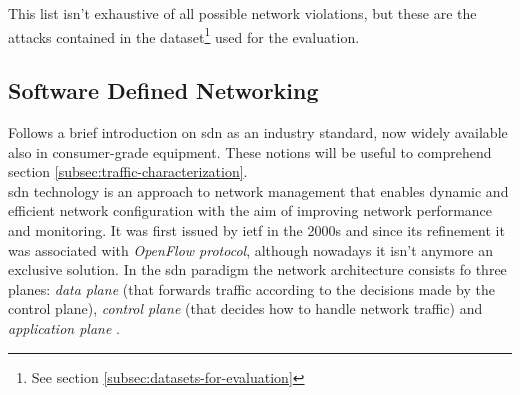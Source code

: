 This list isn't exhaustive of all possible network violations, but these are the attacks contained in the dataset\footnote{See section \ref{subsec:datasets-for-evaluation}} used for the evaluation.


\subsection{Software Defined Networking}
\label{subsec:sdn}

Follows a brief introduction on \gls{sdn} as an industry standard, now widely available also in consumer-grade equipment. These notions will be useful to comprehend section \ref{subsec:traffic-characterization}. \\
\gls{sdn} technology is an approach to network management that enables dynamic and efficient network configuration with the aim of improving network performance and monitoring. It was first issued by \gls{ietf} in the 2000s and since its refinement it was associated with \textit{OpenFlow protocol}, although nowadays it isn't anymore an exclusive solution. In the \gls{sdn} paradigm the network architecture consists fo three planes: \textit{data plane} (that forwards traffic according to the decisions made by the control plane), \textit{control plane} (that decides how to handle network traffic) and \textit{application plane} \cite{Kreutz2015}.

